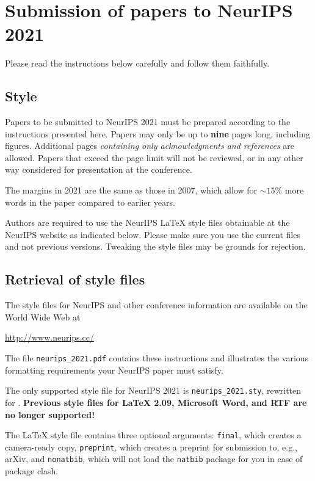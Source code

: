 \documentclass{article}
\begin{document}



\newpage
\section{Submission of papers to NeurIPS 2021}

Please read the instructions below carefully and follow them faithfully.

\subsection{Style}

Papers to be submitted to NeurIPS 2021 must be prepared according to the
instructions presented here. Papers may only be up to {\bf nine} pages long,
including figures. Additional pages \emph{containing only acknowledgments and
references} are allowed. Papers that exceed the page limit will not be
reviewed, or in any other way considered for presentation at the conference.

The margins in 2021 are the same as those in 2007, which allow for $\sim$$15\%$
more words in the paper compared to earlier years.

Authors are required to use the NeurIPS \LaTeX{} style files obtainable at the
NeurIPS website as indicated below. Please make sure you use the current files
and not previous versions. Tweaking the style files may be grounds for
rejection.

\subsection{Retrieval of style files}

The style files for NeurIPS and other conference information are available on
the World Wide Web at
\begin{center}
  \url{http://www.neurips.cc/}
\end{center}
The file \verb+neurips_2021.pdf+ contains these instructions and illustrates the
various formatting requirements your NeurIPS paper must satisfy.

The only supported style file for NeurIPS 2021 is \verb+neurips_2021.sty+,
rewritten for \LaTeXe{}.  \textbf{Previous style files for \LaTeX{} 2.09,
  Microsoft Word, and RTF are no longer supported!}

The \LaTeX{} style file contains three optional arguments: \verb+final+, which
creates a camera-ready copy, \verb+preprint+, which creates a preprint for
submission to, e.g., arXiv, and \verb+nonatbib+, which will not load the
\verb+natbib+ package for you in case of package clash.
\end{document}
